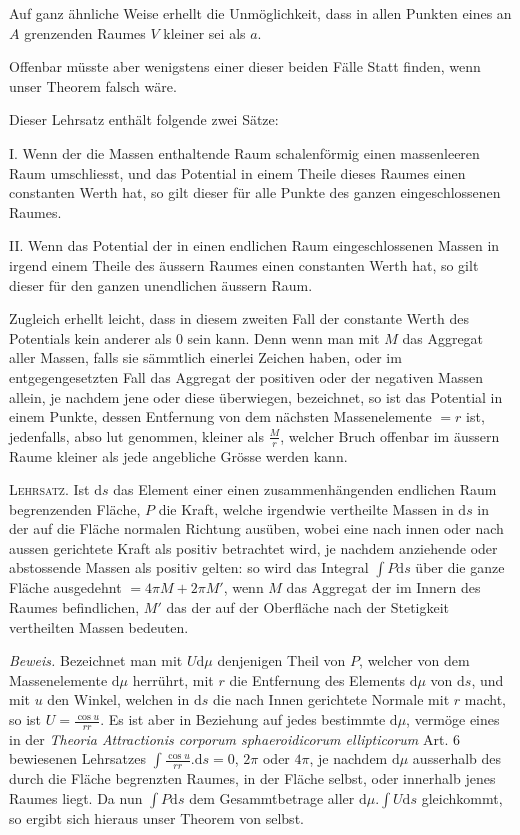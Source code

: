 Auf ganz ähnliche Weise erhellt die Unmöglichkeit, dass in allen Punkten eines an $A$ grenzenden Raumes $V$ kleiner sei als $a$.

Offenbar müsste aber wenigstens einer dieser beiden Fälle Statt finden, wenn unser Theorem falsch wäre.

Dieser Lehrsatz enthält folgende zwei Sätze:

I. Wenn der die Massen enthaltende Raum schalenförmig einen massenleeren Raum umschliesst, und das Potential in einem Theile dieses Raumes einen constanten Werth hat, so gilt dieser für alle Punkte des ganzen eingeschlossenen Raumes.

II. Wenn das Potential der in einen endlichen Raum eingeschlossenen Massen in irgend einem Theile des äussern Raumes einen constanten Werth hat, so gilt dieser für den ganzen unendlichen äussern Raum.

Zugleich erhellt leicht, dass in diesem zweiten Fall der constante Werth des Potentials kein anderer als $0$ sein kann. Denn wenn man mit $M$ das Aggregat aller Massen, falls sie sämmtlich einerlei Zeichen haben, oder im entgegengesetzten Fall das Aggregat der positiven oder der negativen Massen allein, je nachdem jene oder diese überwiegen, bezeichnet, so ist das Potential in einem Punkte, dessen Entfernung von dem nächsten Massenelemente $=r$ ist, jedenfalls, abso%
%
lut genommen, kleiner als $\frac Mr$, welcher Bruch offenbar im äussern Raume kleiner als jede angebliche Grösse werden kann.

\textsc{Lehrsatz.} Ist $\mathrm ds$ das Element einer einen zusammenhängenden endlichen Raum begrenzenden Fläche, $P$ die Kraft, welche irgendwie vertheilte Massen in $\mathrm ds$ in der auf die Fläche normalen Richtung ausüben, wobei eine nach innen oder nach aussen gerichtete Kraft als positiv betrachtet wird, je nachdem anziehende oder abstossende Massen als positiv gelten: so wird das Integral $\int P\mathrm ds$ über die ganze Fläche ausgedehnt $=4\pi M+2\pi M'$, wenn $M$ das Aggregat der im Innern des Raumes befindlichen, $M'$ das der auf der Oberfläche nach der Stetigkeit vertheilten Massen bedeuten.

\textit{Beweis.} Bezeichnet man mit $U\mathrm d\mu$ denjenigen Theil von $P$, welcher von dem Massenelemente $\mathrm d\mu$ herrührt, mit $r$ die Entfernung des Elements $\mathrm d\mu$ von $\mathrm ds$, und mit $u$ den Winkel, welchen in $\mathrm ds$ die nach Innen gerichtete Normale mit $r$ macht, so ist $U=\frac{\cos u}{rr}$. Es ist aber in Beziehung auf jedes bestimmte $\mathrm d\mu$, vermöge eines in der \textit{Theoria Attractionis corporum sphaeroidicorum ellipticorum} Art. 6 bewiesenen Lehrsatzes $\int\frac{\cos u}{rr}.\mathrm ds=0$, $2\pi$ oder $4\pi$, je nachdem $\mathrm d\mu$ ausserhalb des durch die Fläche begrenzten Raumes, in der Fläche selbst, oder innerhalb jenes Raumes liegt. Da nun $\int P\mathrm ds$ dem Gesammtbetrage aller $\mathrm d\mu.\int U\mathrm ds$ gleichkommt, so ergibt sich hieraus unser Theorem von selbst.

